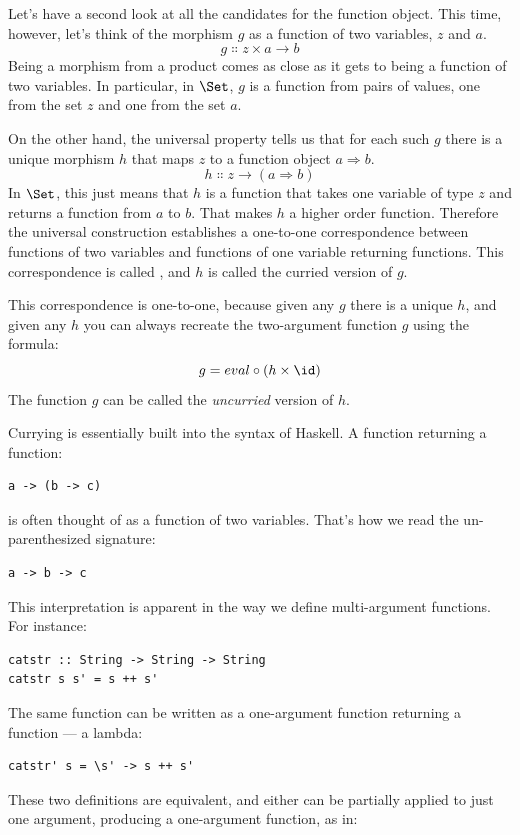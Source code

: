 Let's have a second look at all the candidates for the function object.
This time, however, let's think of the morphism $g$ as a function
of two variables, $z$ and $a$.
\[g \Colon z \times a \to b\]
Being a morphism from a product comes as close as it gets to being a
function of two variables. In particular, in $\Set$, $g$ is
a function from pairs of values, one from the set $z$ and one
from the set $a$.

On the other hand, the universal property tells us that for each such
$g$ there is a unique morphism $h$ that maps $z$ to
a function object $a \Rightarrow b$.
\[h \Colon z \to (a \Rightarrow b)\]
In $\Set$, this just means that $h$ is a function that
takes one variable of type $z$ and returns a function from
$a$ to $b$. That makes $h$ a higher order function.
Therefore the universal construction establishes a one-to-one
correspondence between functions of two variables and functions of one
variable returning functions. This correspondence is called
, and $h$ is called the curried version of $g$.

This correspondence is one-to-one, because given any $g$ there is
a unique $h$, and given any $h$ you can always recreate
the two-argument function $g$ using the formula:
\[g = eval \circ (h \times \id)\]
The function $g$ can be called the \emph{uncurried} version of $h$.

Currying is essentially built into the syntax of Haskell. A function
returning a function:

\begin{Verbatim}
a -> (b -> c)
\end{Verbatim}
is often thought of as a function of two variables. That's how we read
the un-parenthesized signature:

\begin{Verbatim}
a -> b -> c
\end{Verbatim}
This interpretation is apparent in the way we define multi-argument
functions. For instance:

\begin{Verbatim}
catstr :: String -> String -> String
catstr s s' = s ++ s'
\end{Verbatim}
The same function can be written as a one-argument function returning a
function --- a lambda:

\begin{Verbatim}
catstr' s = \s' -> s ++ s'
\end{Verbatim}
These two definitions are equivalent, and either can be partially
applied to just one argument, producing a one-argument function, as in:

